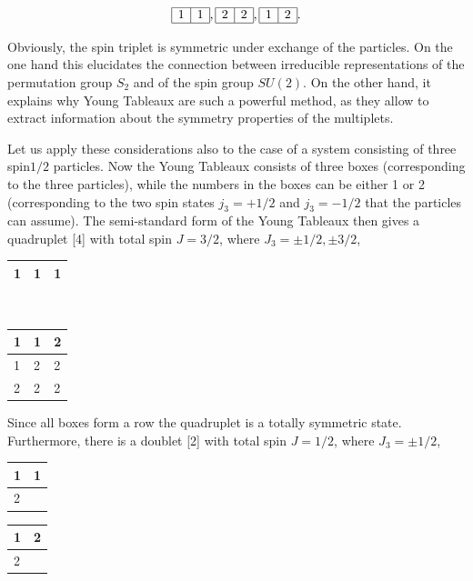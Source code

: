 \documentclass[10pt, letterpaper]{article}
\begin{document}
$$
\begin{array}{|l|l|}
\hline 1 & 1 \\
\hline
\end{array}, \begin{array}{|l|l|}
\hline 2 & 2 \\
\hline
\end{array}, \begin{array}{|l|l|}
\hline 1 & 2 \\
\hline
\end{array} .
$$

Obviously, the spin triplet is symmetric under exchange of the particles. On the one hand this elucidates the connection between irreducible representations of the permutation group $S_{2}$ and of the spin group $S U(2)$. On the other hand, it explains why Young Tableaux are such a powerful method, as they allow to extract information about the symmetry properties of the multiplets.

Let us apply these considerations also to the case of a system consisting of three spin$1 / 2$ particles. Now the Young Tableaux consists of three boxes (corresponding to the three particles), while the numbers in the boxes can be either 1 or 2 (corresponding to the two spin states $j_{3}=+1 / 2$ and $j_{3}=-1 / 2$ that the particles can assume). The semi-standard form of the Young Tableaux then gives a quadruplet [4] with total spin $J=3 / 2$, where $J_{3}= \pm 1 / 2, \pm 3 / 2$,

\begin{center}
\begin{tabular}{|l|l|l|}
\hline
1 & 1 & 1 \\
\hline
\end{tabular}
\end{center}$\quad$\begin{tabular}{|l|l|l|}
\hline
1 & 1 & 2 \\
\hline
1 & 2 & 2 \\
\hline
2 & 2 & 2 \\
\hline
\end{tabular}

Since all boxes form a row the quadruplet is a totally symmetric state. Furthermore, there is a doublet [2] with total spin $J=1 / 2$, where $J_{3}= \pm 1 / 2$,

\begin{center}
\begin{tabular}{|l|l|}
\hline
1 & 1 \\
\hline
2 &  \\
\hline
\end{tabular}
\end{center} \begin{tabular}{|l|l|}
\hline
1 & 2 \\
\hline
2 &  \\
\hline
\end{tabular}
\end{document}

